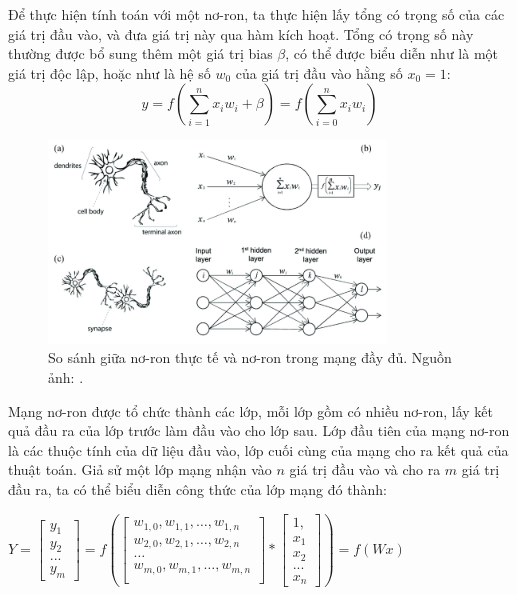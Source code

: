 \documentclass[12pt]{extreport}
\begin{document}
Để thực hiện tính toán với một nơ-ron, ta thực hiện lấy tổng có trọng số của các giá trị đầu vào, và đưa giá trị này qua hàm kích hoạt. Tổng có trọng số này thường được bổ sung thêm một giá trị bias $ \beta $, có thể được biểu diễn như là một giá trị độc lập, hoặc như là hệ số $ w_0 $ của giá trị đầu vào hằng số $ x_0 = 1 $:
$$ y = f(\sum_{i=1}^{n} x_i w_i + \beta) = f(\sum_{i=0}^{n} x_i w_i) $$

\begin{figure}[H]
    \centering
    \includegraphics[width=0.8\textwidth]{figure4}
    \caption{So sánh giữa nơ-ron thực tế và nơ-ron trong mạng đầy đủ. Nguồn ảnh: \cite{article}.}
\end{figure}

Mạng nơ-ron được tổ chức thành các lớp, mỗi lớp gồm có nhiều nơ-ron, lấy kết quả đầu ra của lớp trước làm đầu vào cho lớp sau. Lớp đầu tiên của mạng nơ-ron là các thuộc tính của dữ liệu đầu vào, lớp cuối cùng của mạng cho ra kết quả của thuật toán. Giả sử một lớp mạng nhận vào $ n $ giá trị đầu vào và cho ra $ m $ giá trị đầu ra, ta có thể biểu diễn công thức của lớp mạng đó thành:

\begin{center}
    \begin{math}
        Y = \begin{bmatrix}
            y_1 \\
            y_2 \\
            ... \\
            y_m
        \end{bmatrix} = f \left(\begin{bmatrix}
                w_{1,0}, w_{1,1}, \dots, w_{1,n} \\
                w_{2,0}, w_{2,1}, \dots, w_{2,n} \\
                \dots                            \\
                w_{m,0}, w_{m,1}, \dots, w_{m,n} \\
            \end{bmatrix} * \begin{bmatrix}
                1,  \\
                x_1 \\
                x_2 \\
                ... \\
                x_n
            \end{bmatrix} \right) = f(Wx)
    \end{math}
\end{center}
\end{document}
